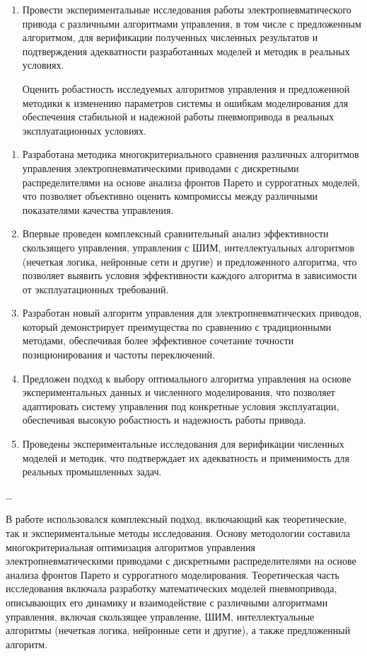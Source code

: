 \begin{enumerate}[beginpenalty=10000]
\item Провести экспериментальные исследования работы электропневматического привода с различными
алгоритмами управления, в том числе с предложенным алгоритмом, для верификации полученных
численных результатов и подтверждения адекватности разработанных моделей и методик в реальных условиях.

Оценить робастность исследуемых алгоритмов управления и предложенной методики к изменению
параметров системы и ошибкам моделирования для обеспечения стабильной и
надежной работы пневмопривода в реальных эксплуатационных условиях.
\end{enumerate}


{\novelty}
\begin{enumerate}[beginpenalty=10000] %
    \item Разработана методика многокритериального сравнения различных алгоритмов управления электропневматическими
    приводами с дискретными распределителями на основе анализа фронтов Парето и суррогатных
    моделей, что позволяет объективно оценить компромиссы между
    различными показателями качества управления.
    \item Впервые проведен комплексный сравнительный анализ эффективности
    скользящего управления, управления с ШИМ, интеллектуальных алгоритмов (нечеткая логика, нейронные сети и другие)
    и предложенного алгоритма, что позволяет выявить условия эффективности каждого
    алгоритма в зависимости от эксплуатационных требований.
    \item Разработан новый алгоритм управления для электропневматических приводов, который демонстрирует
    преимущества по сравнению с традиционными методами, обеспечивая более эффективное
    сочетание точности позиционирования и частоты переключений.
    \item Предложен подход к выбору оптимального алгоритма управления на основе
    экспериментальных данных и численного моделирования, что позволяет адаптировать
    систему управления под конкретные условия эксплуатации, обеспечивая
    высокую робастность и надежность работы привода.
    \item Проведены экспериментальные исследования для верификации численных моделей и методик,
    что подтверждает их адекватность и применимость для реальных промышленных задач.
\end{enumerate}

{\influence} \ldots

{\methods} В работе использовался комплексный подход, включающий как теоретические, так и
экспериментальные методы исследования. Основу методологии составила многокритериальная оптимизация
алгоритмов управления электропневматическими приводами с дискретными распределителями на основе анализа
фронтов Парето и суррогатного моделирования. Теоретическая часть исследования включала разработку математических
моделей пневмопривода, описывающих его динамику и взаимодействие с различными алгоритмами управления, включая скользящее
управление, ШИМ, интеллектуальные алгоритмы (нечеткая логика, нейронные сети и другие), а также предложенный алгоритм.

